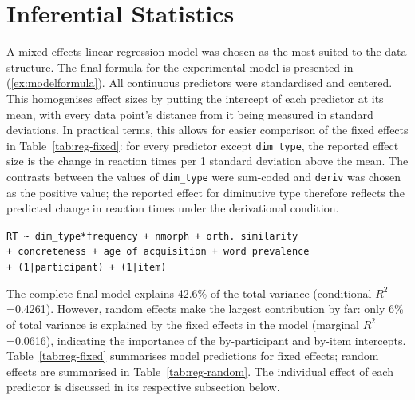 \section{Inferential Statistics} \label{sec:5-inf_stats}
A mixed-effects linear regression model was chosen as the most suited to the data structure. The final formula for the experimental model is presented in (\ref{ex:modelformula}). All continuous predictors were standardised and centered. This homogenises effect sizes by putting the intercept of each predictor at its mean, with every data point's distance from it being measured in standard deviations. In practical terms, this allows for easier comparison of the fixed effects in Table~\ref{tab:reg-fixed}: for every predictor except \texttt{dim\_type}, the reported effect size is the change in reaction times per 1 standard deviation above the mean. The contrasts between the values of \texttt{dim\_type} were sum-coded and \texttt{deriv} was chosen as the positive value; the reported effect for diminutive type therefore reflects the predicted change in reaction times under the derivational condition.

\begin{exe}
\ex \label{ex:modelformula}
\texttt{RT \textasciitilde ~dim\_type*frequency + nmorph + orth. similarity \\ 
+ concreteness + age of acquisition + word prevalence \\
+ (1|participant) + (1|item)}
\end{exe}

The complete final model explains 42.6\% of the total variance (conditional $R^2$=0.4261). However, random effects make the largest contribution by far: only 6\% of total variance is explained by the fixed effects in the model (marginal $R^2$=0.0616), indicating the importance of the by-participant and by-item intercepts. Table~\ref{tab:reg-fixed} summarises model predictions for fixed effects; random effects are summarised in Table~\ref{tab:reg-random}. The individual effect of each predictor is discussed in its respective subsection below.

